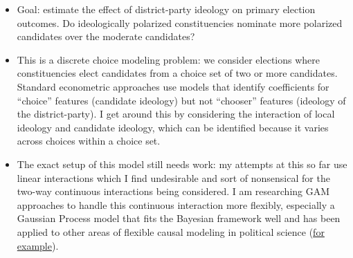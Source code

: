 \documentclass[12pt
              ]{article}
\begin{document}
\begin{itemize}
  \item Goal: estimate the effect of district-party ideology on primary election outcomes.
  Do ideologically polarized constituencies nominate more polarized candidates over the moderate candidates?
  \item This is a discrete choice modeling problem: we consider elections where constituencies elect candidates from a choice set of two or more candidates.
  Standard econometric approaches use models that identify coefficients for ``choice'' features (candidate ideology) but not ``chooser'' features (ideology of the district-party).
  I get around this by considering the interaction of local ideology and candidate ideology, which can be identified because it varies across choices within a choice set.
  
  \item The exact setup of this model still needs work: my attempts at this so far use linear interactions which I find undesirable and sort of nonsensical for the two-way continuous interactions being considered.
  I am researching GAM approaches to handle this continuous interaction more flexibly, especially a Gaussian Process model that fits the Bayesian framework well and has been applied to other areas of flexible causal modeling in political science (\href{https://www.youtube.com/watch?v=6rb5upKwqB4}{for example}).
\end{itemize}

\printbibliography
\end{document}
